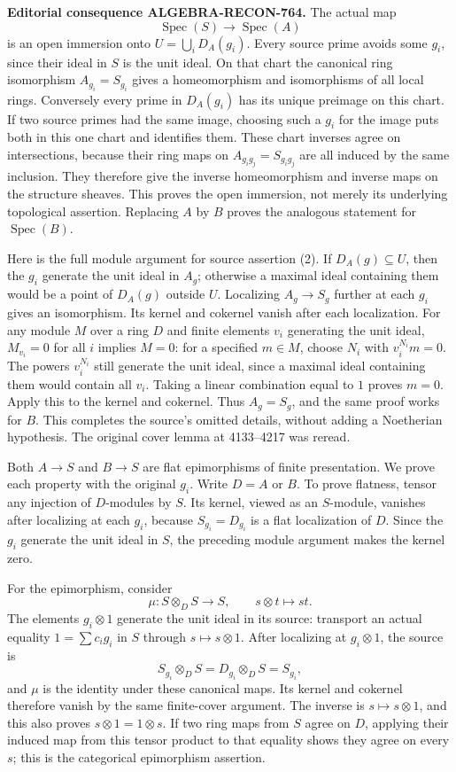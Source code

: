 \textbf{Editorial consequence ALGEBRA-RECON-764.} The actual map \[
 \operatorname{Spec}(S)\longrightarrow\operatorname{Spec}(A)
\] is an open immersion onto \(U=\bigcup_iD_A(g_i)\). Every source prime avoids some \(g_i\), since their ideal in \(S\) is the unit ideal. On that chart the canonical ring isomorphism \(A_{g_i}=S_{g_i}\) gives a homeomorphism and isomorphisms of all local rings. Conversely every prime in \(D_A(g_i)\) has its unique preimage on this chart. If two source primes had the same image, choosing such a \(g_i\) for the image puts both in this one chart and identifies them. These chart inverses agree on intersections, because their ring maps on \(A_{g_ig_j}=S_{g_ig_j}\) are all induced by the same inclusion. They therefore give the inverse homeomorphism and inverse maps on the structure sheaves. This proves the open immersion, not merely its underlying topological assertion. Replacing \(A\) by \(B\) proves the analogous statement for \(\operatorname{Spec}(B)\).

Here is the full module argument for source assertion (2). If \(D_A(g)\subseteq U\), then the \(g_i\) generate the unit ideal in \(A_g\); otherwise a maximal ideal containing them would be a point of \(D_A(g)\) outside \(U\). Localizing \(A_g\to S_g\) further at each \(g_i\) gives an isomorphism. Its kernel and cokernel vanish after each localization. For any module \(M\) over a ring \(D\) and finite elements \(v_i\) generating the unit ideal, \(M_{v_i}=0\) for all \(i\) implies \(M=0\): for a specified \(m\in M\), choose \(N_i\) with \(v_i^{N_i}m=0\). The powers \(v_i^{N_i}\) still generate the unit ideal, since a maximal ideal containing them would contain all \(v_i\). Taking a linear combination equal to \(1\) proves \(m=0\). Apply this to the kernel and cokernel. Thus \(A_g=S_g\), and the same proof works for \(B\). This completes the source's omitted details, without adding a Noetherian hypothesis. The original cover lemma at 4133--4217 was reread.

Both \(A\to S\) and \(B\to S\) are flat epimorphisms of finite presentation. We prove each property with the original \(g_i\). Write \(D=A\) or \(B\). To prove flatness, tensor any injection of \(D\)-modules by \(S\). Its kernel, viewed as an \(S\)-module, vanishes after localizing at each \(g_i\), because \(S_{g_i}=D_{g_i}\) is a flat localization of \(D\). Since the \(g_i\) generate the unit ideal in \(S\), the preceding module argument makes the kernel zero.

For the epimorphism, consider \[
 \mu:S\otimes_D S\longrightarrow S,\qquad s\otimes t\longmapsto st.
\] The elements \(g_i\otimes1\) generate the unit ideal in its source: transport an actual equality \(1=\sum c_i g_i\) in \(S\) through \(s\mapsto s\otimes1\). After localizing at \(g_i\otimes1\), the source is \[
 S_{g_i}\otimes_D S=D_{g_i}\otimes_D S=S_{g_i},
\] and \(\mu\) is the identity under these canonical maps. Its kernel and cokernel therefore vanish by the same finite-cover argument. The inverse is \(s\mapsto s\otimes1\), and this also proves \(s\otimes1=1\otimes s\). If two ring maps from \(S\) agree on \(D\), applying their induced map from this tensor product to that equality shows they agree on every \(s\); this is the categorical epimorphism assertion.

